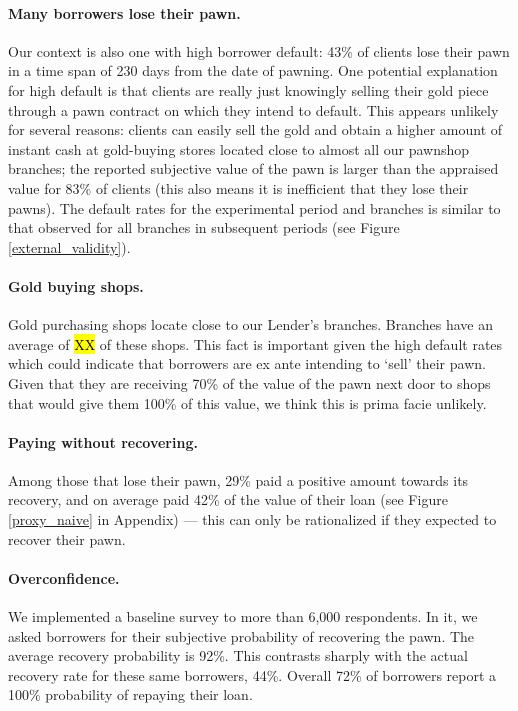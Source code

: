 \documentclass[12pt, a4paper]{article}
\begin{document}
\paragraph*{Many borrowers lose their pawn.}
Our context is also one with high borrower default: 43\% of clients lose their pawn in a time span of 230 days from the date of pawning. One potential explanation for high default is that clients are really just knowingly selling their gold piece through a pawn contract on which they intend to default. This appears unlikely for several reasons: clients can easily sell the gold and obtain a higher amount of instant cash at gold-buying stores located close to almost all our pawnshop branches;
the reported subjective value of the pawn is larger than the appraised value for 83\% of clients (this also means it is inefficient that they lose their pawns). The default rates for the experimental period and branches is similar to that observed for all branches in subsequent periods (see Figure \ref{external_validity}).  

\paragraph*{Gold buying shops.} Gold purchasing shops locate close to our Lender's branches. Branches have an average of \hl{XX} of these shops.  This fact is important given the high default rates which could indicate that borrowers are ex ante intending to `sell' their pawn.  Given that they are receiving 70\% of the value of the pawn next door to shops that would give them 100\% of this value, we think this is prima facie unlikely.

\paragraph*{Paying without recovering.} Among those that lose their pawn, 29\% paid a positive amount towards its recovery, and on average paid 42\% of the value of their loan (see Figure \ref{proxy_naive} in Appendix) --- this can only be rationalized if they expected to recover their pawn.

\paragraph*{Overconfidence.} We implemented a baseline survey to more than 6,000 respondents. In it, we asked borrowers for their subjective probability of recovering the pawn. The average recovery probability is 92\%. This contrasts sharply with the actual recovery rate for these same borrowers, 44\%. Overall 72\% of borrowers report a 100\% probability of repaying their loan.    %
\end{document}
